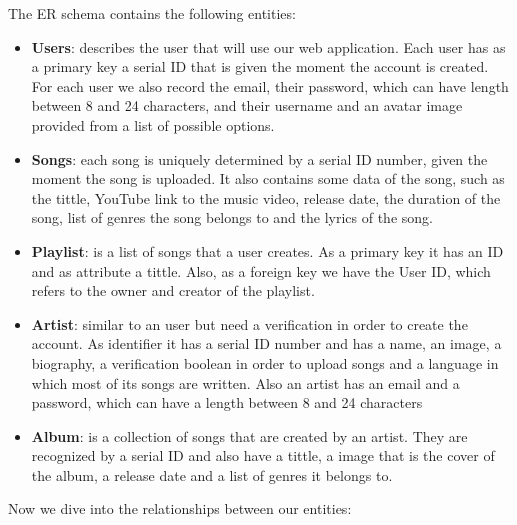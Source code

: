 The ER schema contains the following entities:
\begin{itemize}
    \item \textbf{Users}: describes the user that will use our web application. Each user has as a primary key a serial ID that is given the moment the account is created. For each user we also record the email, their password, which can have length between 8 and 24 characters, and their username and an avatar image provided from a list of possible options.

    \item \textbf{Songs}: each song is uniquely determined by a serial ID number, given the moment the song is uploaded. It also contains some data of the song, such as the tittle, YouTube link to the music video, release date, the duration of the song, list of genres the song belongs to and the lyrics of the song.

    \item \textbf{Playlist}: is a list of songs that a user creates. As a primary key it has an ID and as attribute a tittle. Also, as a foreign key we have the User ID, which refers to the owner and creator of the playlist.

    \item \textbf{Artist}: similar to an user but need a verification in order to create the account. As identifier it has a serial ID number and has a name, an image, a biography, a verification boolean in order to upload songs and a language in which most of its songs are written. Also an artist has an email and a password, which can have a length between 8 and 24 characters

    \item \textbf{Album}: is a collection of songs that are created by an artist. They are recognized by a serial ID and also have a tittle, a image that is the cover of the album, a release date and a list of genres it belongs to.
\end{itemize}

Now we dive into the relationships between our entities:

